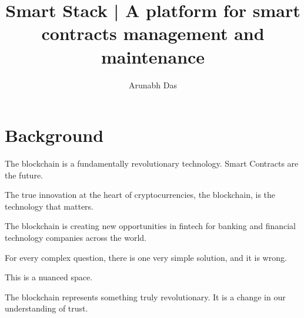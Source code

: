 \documentclass{article}
\author{Arunabh Das}
\title{Smart Stack | A platform for smart contracts management and maintenance}
\begin{document}
\maketitle

\section{Background}

The blockchain is a fundamentally revolutionary technology. Smart Contracts are the future. 

The true innovation at the heart of cryptocurrencies, the blockchain, is the technology that matters.

The blockchain is creating new opportunities in fintech for banking and financial technology companies  across the world.

For every complex question, there is one very simple solution, and it is wrong.

This is a nuanced space. 

The blockchain represents something truly revolutionary. It is a change in our understanding of trust.
\end{document}
